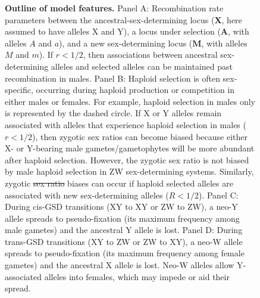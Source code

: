 \documentclass[10pt,letterpaper]{article}
\providecommand{\DIFaddtex}[1]{{\protect\color{blue}\uwave{#1}}} %
\providecommand{\DIFdeltex}[1]{{\protect\color{red}\sout{#1}}}                      %
\providecommand{\DIFaddFL}[1]{\DIFadd{#1}} %
\providecommand{\DIFdelFL}[1]{\DIFdel{#1}} %
\providecommand{\DIFaddbeginFL}{} %
\providecommand{\DIFaddendFL}{} %
\providecommand{\DIFdelbeginFL}{} %
\providecommand{\DIFdelendFL}{} %
\providecommand{\DIFadd}[1]{\texorpdfstring{\DIFaddtex{#1}}{#1}} %
\providecommand{\DIFdel}[1]{\texorpdfstring{\DIFdeltex{#1}}{}} %
\begin{document}
\begin{figure}[!h]
\caption{
{\bf Outline of model features.}
Panel A: Recombination rate parameters between the ancestral-sex-determining locus ($\mathbf{X}$, here assumed to have alleles X and Y), a locus under selection ($\mathbf{A}$, with alleles $A$ and $a$), and a new sex-determining locus ($\mathbf{M}$, with alleles $M$ and $m$). 
If $r<1/2$, then associations between ancestral sex-determining alleles and selected alleles can be maintained past recombination in males. 
Panel B: Haploid selection is often sex-specific, occurring during haploid production or competition in either males or females. 
For example, haploid selection in males only is represented by the dashed circle.  
If X or Y alleles remain associated with alleles that experience haploid selection in males ($r<1/2$), then zygotic sex ratios can become biased because either X- or Y-bearing male gametes/gametophytes will be more abundant after haploid selection. 
However, the zygotic sex ratio is not biased by male haploid selection in ZW sex-determining systems. 
Similarly, zygotic \DIFdelbeginFL \DIFdelFL{sex ratio }\DIFdelendFL \DIFaddbeginFL \DIFaddFL{sex-ratio }\DIFaddendFL biases can occur if haploid selected alleles are associated with new sex-determining alleles ($R<1/2$). 
Panel C: During cis-GSD transitions (XY to XY or ZW to ZW), a neo-Y allele spreads to pseudo-fixation (its maximum frequency among male gametes) and the ancestral Y allele is lost. 
Panel D: During trans-GSD transitions (XY to ZW or ZW to XY), a neo-W allele spreads to pseudo-fixation (its maximum frequency among female gametes) and the ancestral X allele is lost. 
Neo-W alleles allow Y-associated alleles into females, which may impede or aid their spread. 
}
\label{fig:model_outline}
\end{figure}
\end{document}
